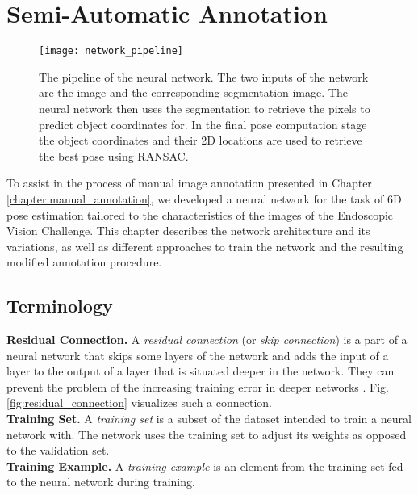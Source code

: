 \chapter{Semi-Automatic Annotation} \label{chapter:semi_automatic}

\begin{figure}[!tbp]
	\centering
    \texttt{[image: network\_pipeline]}
    \caption{The pipeline of the neural network. The two inputs of the network are the image and the corresponding segmentation image. The neural network then uses the segmentation to retrieve the pixels to predict object coordinates for. In the final pose computation stage the object coordinates and their 2D locations are used to retrieve the best pose using RANSAC.}
    	\label{fig:network_pipeline}
\end{figure} 

To assist in the process of manual image annotation presented in Chapter \ref{chapter:manual_annotation}, we developed a neural network for the task of 6D pose estimation tailored to the characteristics of the images of the Endoscopic Vision Challenge. This chapter describes the network architecture and its variations, as well as different approaches to train the network and the resulting modified annotation procedure.

\section{Terminology} \label{section:network_terminology}

\noindent\textbf{Residual Connection.} A \textit{residual connection} (or \textit{skip connection}) is a part of a neural network that skips some layers of the network and adds the input of a layer to the output of a layer that is situated deeper in the network. They can prevent the problem of the increasing training error in deeper networks \cite{resnet}. Fig. \ref{fig:residual_connection} visualizes such a connection. \\

\noindent\textbf{Training Set.} A \textit{training set} is a subset of the dataset intended to train a neural network with. The network uses the training set to adjust its weights as opposed to the validation set. \\

\noindent\textbf{Training Example.} A \textit{training example} is an element from the training set fed to the neural network during training. \\

